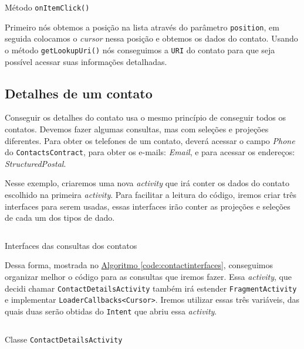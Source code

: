 \documentclass[a4paper,12pt,brazil,oneside]{book}
\begin{document}
		\begin{listing}[H]
		\inputminted[linenos=true,fontsize=\small,frame=lines, framesep=2mm, tabsize=2,numbersep=5pt]{java}{src/api/contacts/onitemclick.java}
		\caption{Método \texttt{onItemClick()}}
		\label{code:contactonitemclick}
		\end{listing} 	
			
	Primeiro nós obtemos a posição na lista através do parâmetro \texttt{position}, em seguida colocamos o \emph{cursor} nessa posição e obtemos os dados do contato. Usando o método \texttt{getLookupUri()} nós conseguimos a \texttt{URI} do contato para que seja possível acessar suas informações detalhadas.

	\subsection{Detalhes de um contato}

	Conseguir os detalhes do contato usa o mesmo princípio de conseguir todos os contatos. Devemos fazer algumas consultas, mas com seleções e projeções diferentes. Para obter os telefones de um contato, deverá acessar o campo \emph{Phone} do \texttt{ContactsContract}, para obter os e-mails: \emph{Email}, e para acessar os endereços: \emph{StructuredPostal}.

	Nesse exemplo, criaremos uma nova \emph{activity} que irá conter os dados do contato escolhido na primeira \emph{activity}. Para facilitar a leitura do código, iremos criar três interfaces para serem usadas, essas interfaces irão conter as projeções e seleções de cada um dos tipos de dado. 

		\begin{listing}[H]
		\inputminted[linenos=true,fontsize=\small,frame=lines, framesep=2mm, tabsize=2,numbersep=5pt]{java}{src/api/contacts/interfaces.java}
		\caption{Interfaces das consultas dos contatos}
		\label{code:contactinterfaces}
		\end{listing} 	

	Dessa forma, mostrada no \hyperref[code:contactinterfaces]{Algoritmo \ref*{code:contactinterfaces}}, conseguimos organizar melhor o código para as consultas que iremos fazer. Essa \emph{activity}, que decidi chamar \texttt{ContactDetailsActivity} também irá estender \texttt{FragmentActivity} e implementar \texttt{LoaderCallbacks<Cursor>}. Iremos utilizar essas três variáveis, das quais duas serão obtidas do \texttt{Intent} que abriu essa \emph{activity}.
	
		\begin{listing}[H]
		\inputminted[linenos=true,fontsize=\small,frame=lines, framesep=2mm, tabsize=2,numbersep=5pt]{java}{src/api/contacts/contactdetails.java}
		\caption{Classe \texttt{ContactDetailsActivity}}
		\label{code:contactdetailsactivity}
		\end{listing} 	
\end{document}
